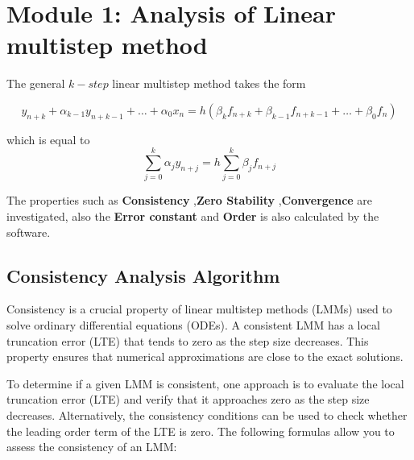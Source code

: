 \documentclass[a4paper, twoside]{report} %
\begin{document}


	\section{Module 1: Analysis of Linear multistep method}
	The general $k-step$ linear multistep method takes the form


	\begin{equation}
		y_{n+k} + \alpha_{k-1}y_{n+k-1}+ \dots + \alpha_0x_n = h(\beta_kf_{n+k}+ \beta_{k-1}f_{n+k-1}+ \dots + \beta_0f_n)
	\end{equation}

	which is equal to
	\begin{equation}
		\sum_{j=0}^{k} \alpha_j y_{n+j} = h \sum_{j=0}^{k} \beta_j f_{n+j}
	\end{equation} \cite{2022JFatokunEtAl}

	The properties such as \textbf{Consistency} ,\textbf{Zero Stability} ,\textbf{Convergence} are investigated, also the \textbf{Error constant} and \textbf{Order} is also calculated by the software.

	\subsection{Consistency Analysis Algorithm}

	Consistency is a crucial property of linear multistep methods (LMMs) used to solve ordinary differential equations (ODEs). A consistent LMM has a local truncation error (LTE) that tends to zero as the step size decreases. This property ensures that numerical approximations are close to the exact solutions.

	To determine if a given LMM is consistent, one approach is to evaluate the local truncation error (LTE) and verify that it approaches zero as the step size decreases. Alternatively, the consistency conditions can be used to check whether the leading order term of the LTE is zero. The following formulas allow you to assess the consistency of an LMM:
\end{document}
